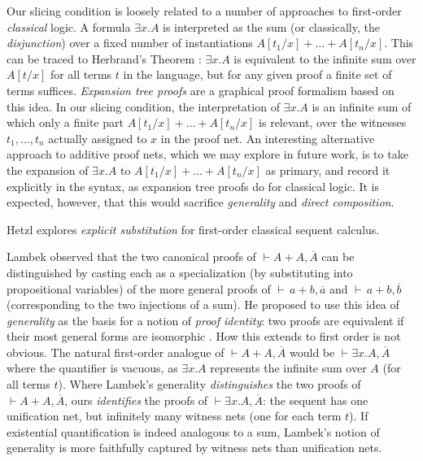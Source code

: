 \documentclass[UKenglish]{lipics-v2019}
\newcommand\+{+}
\renewcommand\*{\times}
\newcommand\dual[1]{\overline{#1}}
\newcommand\seq[2]{{\vdash}#1,#2}
\begin{document}
Our slicing condition is loosely related to a number of approaches to first-order \emph{classical} logic. A formula $\exists x.A$ is interpreted as the sum (or classically, the \emph{disjunction}) over a fixed number of instantiations $A[t_1/x]\+\dots\+A[t_n/x]$. This can be traced to Herbrand's Theorem \cite{Herbrand-1930}: $\exists x.A$ is equivalent to the infinite sum over $A[t/x]$ for all terms $t$ in the language, but for any given proof a finite set of terms suffices. \emph{Expansion tree proofs} \cite{Miller-1987,Heijltjes-2010} are a graphical proof formalism based on this idea.
%
In our slicing condition, the interpretation of $\exists x.A$ is an infinite sum of which only a finite part $A[t_1/x]\+\dots\+A[t_n/x]$ is relevant, over the witnesses $t_1,\dots,t_n$ actually assigned to $x$ in the proof net. An interesting alternative approach to additive proof nets, which we may explore in future work, is to take the expansion of $\exists x.A$ to $A[t_1/x]\+\dots\+A[t_n/x]$ as primary, and record it explicitly in the syntax, as expansion tree proofs do for classical logic. It is expected, however, that this would sacrifice \emph{generality} and \emph{direct composition}.

Hetzl \cite{Hetzl-2010} explores \emph{explicit substitution} for first-order classical sequent calculus.

%
%
Lambek observed that the two canonical proofs of $\seq{A{\+}A}{\dual A}$ can be distinguished by casting each as a specialization (by substituting into propositional variables) of the more general proofs of $\seq{\,a{\+}b}{\dual a}$ and $\seq{\,a{\+}b}{\dual b}$ (corresponding to the two injections of a sum). He proposed to use this idea of \emph{generality} as the basis for a notion of \emph{proof identity}: two proofs are equivalent if their most general forms are isomorphic \cite{Lambek-1968-1972}. How this extends to first order is not obvious. The natural first-order analogue of $\seq{A{\+}A}{\dual A}$ would be $\seq{\exists x.A}{\dual A}$ where the quantifier is vacuous, as $\exists x.A$ represents the infinite sum over $A$ (for all terms $t$). Where Lambek's generality \emph{distinguishes} the two proofs of $\seq{A{\+}A}{\dual A}$, ours \emph{identifies} the proofs of $\seq{\exists x.A}{\dual A}$: the sequent has one unification net, but infinitely many witness nets (one for each term $t$). If existential quantification is indeed analogous to a sum, Lambek's notion of generality is more faithfully captured by witness nets than unification nets.
\end{document}

